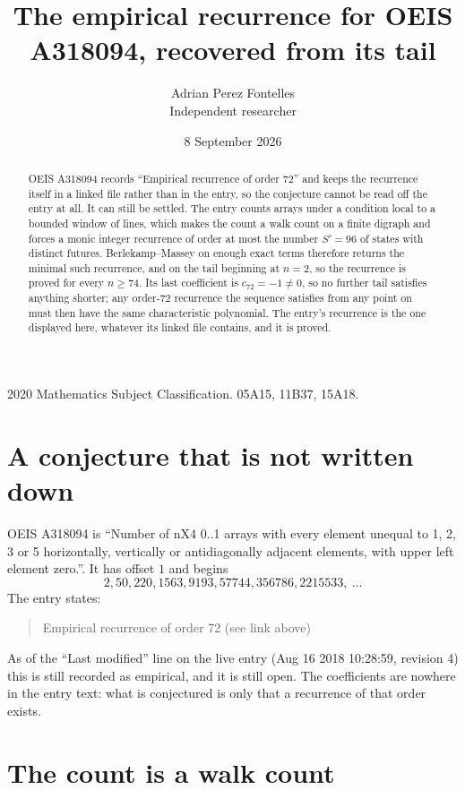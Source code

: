 \documentclass[11pt,a4paper]{article}
\title{The empirical recurrence for OEIS A318094, recovered from its tail}
\author{Adrian Perez Fontelles\\ \small Independent researcher}
\date{8 September 2026}
\theoremstyle{plain}
\theoremstyle{definition}
\begin{document}
\maketitle

\begin{abstract}
OEIS A318094 records ``Empirical recurrence of order $72$'' and keeps the recurrence itself in
a linked file rather than in the entry, so the conjecture cannot be read off the entry at all.
It can still be settled. The entry counts arrays under a condition local to a bounded window of
lines, which makes the count a walk count on a finite digraph and forces a monic integer
recurrence of order at most the number $S'=96$ of states with distinct futures. Berlekamp--Massey on
enough exact terms therefore returns the minimal such recurrence, and on the tail beginning at $n=2$, so the recurrence is proved for every $n\ge74$.
Its last coefficient is $c_{72}=-1\neq0$, so no further tail satisfies anything
shorter; any order-$72$ recurrence the sequence satisfies from any point on must then have
the same characteristic polynomial. The entry's recurrence is the one displayed here, whatever
its linked file contains, and it is proved.
\end{abstract}

\noindent\small 2020 Mathematics Subject Classification. 05A15, 11B37, 15A18.\normalsize

\section{A conjecture that is not written down}

OEIS A318094 is ``Number of nX4 0..1 arrays with every element unequal to 1, 2, 3 or 5 horizontally, vertically or antidiagonally adjacent elements, with upper left element zero.''. It has offset $1$ and begins
\[
2, 50, 220, 1563, 9193, 57744, 356786, 2215533,\ \dots
\]
The entry states:
\begin{quote}
Empirical recurrence of order 72 (see link above)
\end{quote}
As of the ``Last modified'' line on the live entry (Aug 16 2018 10:28:59, revision 4)
this is still recorded as empirical, and it is still open. The coefficients are nowhere in the
entry text: what is conjectured is only that a recurrence of that order exists.

\section{The count is a walk count}
\end{document}
